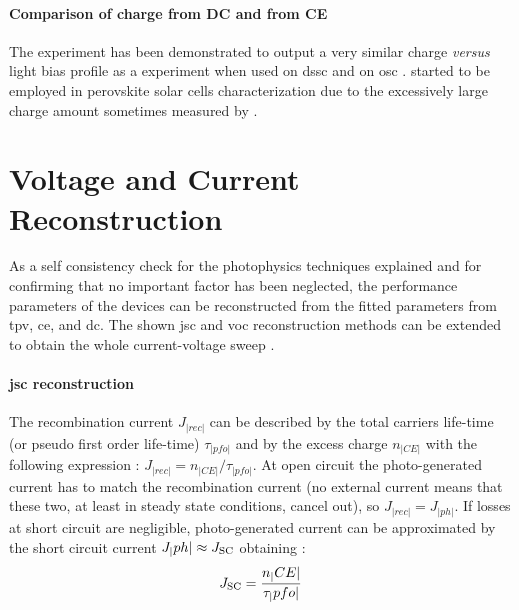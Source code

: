 	\paragraph{Comparison of charge from DC and from CE}
	The  experiment has been demonstrated to output a very similar charge \textsl{versus} light bias profile as a  experiment when used on \gls{dssc} \cite{ORegan2005,Barnes2013} and on \gls{osc} \cite{Shuttle2008a}.
	 started to be employed in perovskite solar cells characterization due to the excessively large charge amount sometimes measured by  \cite{Wheeler2017,ORegan2015b}.

\FloatBarrier
\newpage
\section{Voltage and Current Reconstruction}
As a self consistency check for the photophysics techniques explained and for confirming that no important factor has been neglected, the performance parameters of the devices can be reconstructed from the fitted parameters from \gls{tpv}, \gls{ce}, and \gls{dc}.
The shown \gls{jsc} and \gls{voc} reconstruction methods can be extended to obtain the whole current-voltage sweep \cite{Maurano2011}.

\paragraph{\Gls{jsc} reconstruction}
The recombination current $J_|rec|$ can be described by the total carriers life-time (or pseudo first order life-time) $\tau_|pfo|$ and by the excess charge $n_|CE|$ with the following expression \cite{Wheeler2017,Du2018}: $J_|rec| = n_|CE| / \tau_|pfo|$.
At open circuit the photo-generated current has to match the recombination current (no external current means that these two, at least in steady state conditions, cancel out), so $J_|rec| = J_|ph|$.
If losses at short circuit are negligible, photo-generated current can be approximated by the short circuit current $J_|ph| \approx J_\mathrm{SC}$ obtaining \cite{ORegan2015b}:
\begin{equation}\label{eq:reconstruction_jsc}
J_\mathrm{SC} = \frac{n_|CE|}{\tau_|pfo|}
\end{equation}


